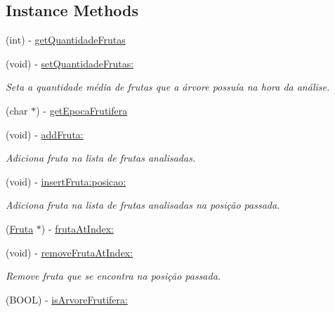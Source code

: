 \subsection*{Instance Methods}
\begin{DoxyCompactItemize}
\item 
(int) -\/ \hyperlink{interface_arvore_frutifera_a691238edae60caa881896cb35691c653}{get\+Quantidade\+Frutas}
\item 
(void) -\/ \hyperlink{interface_arvore_frutifera_ac1e9d292fe4f2bbdc047bee97527426d}{set\+Quantidade\+Frutas\+:}
\begin{DoxyCompactList}\small\item\em Seta a quantidade média de frutas que a árvore possuía na hora da análise. \end{DoxyCompactList}\item 
(char $\ast$) -\/ \hyperlink{interface_arvore_frutifera_a8f487349ee1aa0bdb6871d1685c16843}{get\+Epoca\+Frutifera}
\item 
(void) -\/ \hyperlink{interface_arvore_frutifera_a0e2af9007f8174001ce9cbc4d92d2549}{add\+Fruta\+:}
\begin{DoxyCompactList}\small\item\em Adiciona fruta na lista de frutas analisadas. \end{DoxyCompactList}\item 
(void) -\/ \hyperlink{interface_arvore_frutifera_a6a388570a869639f60432a106c1b0e46}{insert\+Fruta\+:posicao\+:}
\begin{DoxyCompactList}\small\item\em Adiciona fruta na lista de frutas analisadas na posição passada. \end{DoxyCompactList}\item 
(\hyperlink{interface_fruta}{Fruta} $\ast$) -\/ \hyperlink{interface_arvore_frutifera_a5628e0fc6b0d5b8b006dfe3d405e4584}{fruta\+At\+Index\+:}
\item 
(void) -\/ \hyperlink{interface_arvore_frutifera_a00ebdbd08305303aa49fcac8655e8a54}{remove\+Fruta\+At\+Index\+:}
\begin{DoxyCompactList}\small\item\em Remove fruta que se encontra na posição passada. \end{DoxyCompactList}\item 
(B\+O\+O\+L) -\/ \hyperlink{interface_arvore_frutifera_abe74166806547db2cf256220a5fd3a37}{is\+Arvore\+Frutifera\+:}
\end{DoxyCompactItemize}
